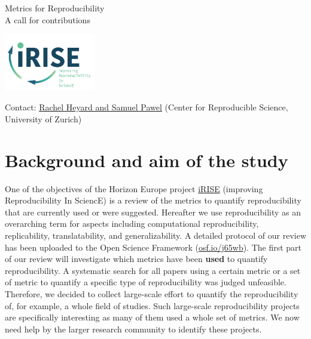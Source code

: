 \documentclass[a4paper,11pt]{report}
\begin{document}
\begin{minipage}{0.75\textwidth}
{\Huge \textcolor{iRISEblue}{Metrics for Reproducibility}}\\[.75ex]
{\Large \textcolor{iRISEblue}{A call for contributions}}\\[1ex]
\end{minipage}
\begin{minipage}{0.25\textwidth}
    \vspace{-1.25cm}
    \flushright
    \includegraphics[height=2.5cm]{../misc/iRISE-lightlogo.png}
\end{minipage}
{\footnotesize Contact: \href{mailto:rachel.heyard@uzh.ch}{Rachel Heyard and Samuel Pawel} (Center for Reproducible Science, University of Zurich)}

\section*{Background and aim of the study}
One of the objectives of the Horizon Europe project \href{https://irise-project.eu/}{iRISE} (improving Reproducibility In SciencE) is a review of the metrics to quantify reproducibility that are currently used or were suggested. Hereafter we use reproducibility as an overarching term for aspects including computational reproducibility, replicability, translatability, and generalizability. A detailed protocol of our review has been uploaded to the Open Science Framework (\href{https://osf.io/j65wb}{osf.io/j65wb}). The first part of our review will investigate which metrics have been \textbf{used} to quantify reproducibility. A systematic search for all papers using a certain metric or a set of metric to quantify a specific type of reproducibility was judged unfeasible. Therefore, we decided to collect large-scale effort to quantify the reproducibility of, for example, a whole field of studies. Such large-scale reproducibility projects are specifically interesting as many of them used a whole set of metrics. We now need help by the larger research community to identify these projects.
\end{document}
